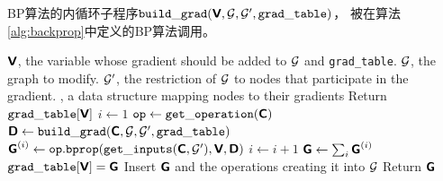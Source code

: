 \begin{algorithm}[ht]
\caption{\gls{BP}算法的内循环子程序${\tt build\_grad}(\textsf{\textbf{V}}, \mathcal{G}, \mathcal{G}', {\tt grad\_table})$，
被在算法\ref{alg:backprop}中定义的\gls{BP}算法调用。
}
\label{alg:build_grad}
\begin{algorithmic}
\REQUIRE $\textsf{\textbf{V}}$, the variable whose gradient should be added to $\mathcal{G}$
and {\tt grad\_table}.
\REQUIRE $\mathcal{G}$, the graph to modify.
\REQUIRE $\mathcal{G}'$, the restriction of $\mathcal{G}$ to nodes that participate
in the gradient.
, a data structure mapping nodes to their
gradients
 \STATE Return ${\tt grad\_table}[\textsf{\textbf{V}}]$
\ENDIF
\STATE $i \leftarrow 1$
\STATE ${\tt op} \leftarrow {\tt get\_operation}(\textsf{\textbf{C}})$
\STATE $\textsf{\textbf{D}} \leftarrow {\tt build\_grad}(\textsf{\textbf{C}}, \mathcal{G}, \mathcal{G}', {\tt grad\_table})$
\STATE $\textsf{\textbf{G}}^{(i)} \leftarrow {\tt op.bprop}({\tt get\_inputs}(\textsf{\textbf{C}}, \mathcal{G}'), \textsf{\textbf{V}}, \textsf{\textbf{D}})$ 
\STATE $i \leftarrow i + 1$
\ENDFOR
\STATE $\textsf{\textbf{G}} \leftarrow \sum_i \textsf{\textbf{G}}^{(i)}$
\STATE ${\tt grad\_table}[\textsf{\textbf{V}}] = \textsf{\textbf{G}}$
\STATE Insert $\textsf{\textbf{G}}$ and the operations creating it into $\mathcal{G}$
\STATE Return $\textsf{\textbf{G}}$
\end{algorithmic}
\end{algorithm}


  
